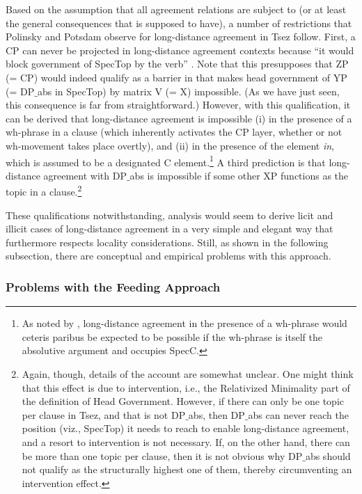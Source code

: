 \documentclass[output=paper
,modfonts
,nonflat]{langsci/langscibook}
\begin{document}
Based on the assumption that all agreement relations are subject to
\LLast (or at least the general consequences that \LLast is supposed
to have), a number of restrictions that Polinsky and Potsdam observe for
long-distance agreement in Tsez follow. First, a CP can never be
projected in long-distance agreement contexts because ``it would block
government of SpecTop by the verb''
\citep[638]{Polinsky&Potsdam:01}. Note  that this presupposes that
ZP (= CP) would indeed qualify as a barrier in \Last that makes
head government of YP (= DP$\_${abs} in SpecTop) by matrix V (= X)
impossible. (As we have just seen, this consequence is far from
straightforward.) However, with this qualification, it can be derived
that long-distance agreement is impossible (i) in the presence of a
wh-phrase in a clause (which inherently activates the CP layer,
whether or not wh-movement takes place overtly), and (ii) in the
presence of the element {\it \textcrlambda in}, which is assumed to be
a designated C element.\footnote{\label{whabs}As noted by
  \citet[fn. 20]{Polinsky&Potsdam:01}, long-distance agreement in the
  presence of a 
  wh-phrase would ceteris paribus be expected to be possible if the
  wh-phrase is itself the absolutive argument and occupies SpecC.}
 A third prediction is that long-distance
agreement with DP$\_${abs} is impossible if some other XP functions as
the topic in a clause.\footnote{Again, though, details of the account
  are somewhat unclear. One might think that this effect is due to
  intervention, i.e., the Relativized Minimality part of the
  definition of Head Government. However,  if there can only be one topic per clause in
  Tsez, and that is not DP$\_${abs}, then DP$\_${abs} can never reach the
  position (viz., SpecTop) it needs to reach to enable long-distance
  agreement, and a resort to intervention is not necessary. If, on the other hand, there can be more than one topic
  per clause, then it is not obvious why DP$\_${abs} should not qualify
  as the structurally highest one of them, thereby circumventing an
  intervention effect.}

These qualifications notwithstanding, 
analysis would seem to derive licit and illicit cases of long-distance
agreement in a very simple and elegant way that furthermore respects
locality considerations. Still, as shown in the following subsection,
there are conceptual and empirical problems with this approach.


\subsubsection{Problems with the Feeding Approach}
\end{document}
